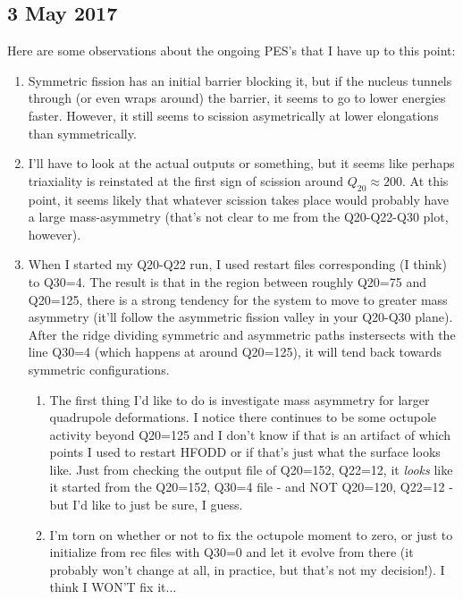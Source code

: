 \documentclass[]{report}
\begin{document}
\subsection*{3 May 2017}
Here are some observations about the ongoing PES's that I have up to this point:
\begin{enumerate}
\item Symmetric fission has an initial barrier blocking it, but if the nucleus tunnels through (or even wraps around) the barrier, it seems to go to lower energies faster. However, it still seems to scission asymetrically at lower elongations than symmetrically.
\item I'll have to look at the actual outputs or something, but it seems like perhaps triaxiality is reinstated at the first sign of scission around $Q_{20}\approx200$. At this point, it seems likely that whatever scission takes place would probably have a large mass-asymmetry (that's not clear to me from the Q20-Q22-Q30 plot, however).
\item When I started my Q20-Q22 run, I used restart files corresponding (I think) to Q30=4. The result is that in the region between roughly Q20=75 and Q20=125, there is a strong tendency for the system to move to greater mass asymmetry (it'll follow the asymmetric fission valley in your Q20-Q30 plane). After the ridge dividing symmetric and asymmetric paths instersects with the line Q30=4 (which happens at around Q20=125), it will tend back towards symmetric configurations.
\begin{enumerate}
\item The first thing I'd like to do is investigate mass asymmetry for larger quadrupole deformations. I notice there continues to be some octupole activity beyond Q20=125 and I don't know if that is an artifact of which points I used to restart HFODD or if that's just what the surface looks like. Just from checking the output file of Q20=152, Q22=12, it \textit{looks} like it started from the Q20=152, Q30=4 file - and NOT Q20=120, Q22=12 - but I'd like to just be sure, I guess.
\item I'm torn on whether or not to fix the octupole moment to zero, or just to initialize from rec files with Q30=0 and let it evolve from there (it probably won't change at all, in practice, but that's not my decision!). I think I WON'T fix it...
\end{enumerate} 
\end{enumerate}
\end{document}
